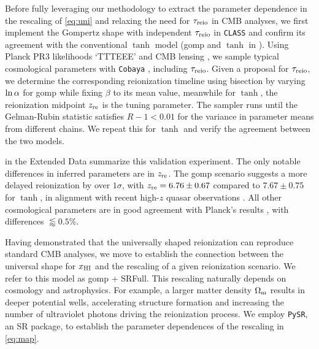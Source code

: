 Before fully leveraging our methodology to extract the parameter
dependence in the rescaling of \cref{eq:uni} and relaxing the need for
$\tau_{\mathrm{reio}}$ in CMB analyses, we first implement the Gompertz shape with
independent $\tau_{\mathrm{reio}}$ in \texttt{CLASS} and confirm its agreement
with the conventional $\tanh$ model (gomp and $\tanh$ in
).
Using Planck PR3 likelihoods `TTTEEE' \cite{Planck2020c} and CMB lensing
\cite{Planck2020d}, we sample typical cosmological parameters with
\texttt{Cobaya} \cite{Torrado2020}, including $\tau_{\mathrm{reio}}$.
Given a proposal for $\tau_{\mathrm{reio}}$, we determine the corresponding
reionization timeline using bisection by varying $\ln\alpha$ for gomp
while fixing $\beta$ to its mean value,
meanwhile for $\tanh$, the reionization midpoint $z_{\mathrm{re}}$ is the tuning
parameter.
The sampler runs until the Gelman-Rubin statistic \cite{Gelman1992}
satisfies $R - 1 < 0.01$ for the variance in parameter means from
different chains.
We repeat this for $\tanh$ and verify the agreement between the two
models.

 in the Extended Data summarize this
validation experiment.
The only notable differences in inferred parameters are in $z_{\mathrm{re}}$.
The gomp scenario suggests a more delayed reionization by over
$1\sigma$, with $z_{\mathrm{re}} = 6.76 \pm 0.67$ compared to $7.67 \pm 0.75$ for
$\tanh$, in alignment with recent high-$z$ quasar observations
\cite{Keating2020}.
All other cosmological parameters are in good agreement with Planck's
results \cite{Planck2020a}, with differences $\lessapprox 0.5 \%$.

Having demonstrated that the universally shaped reionization can
reproduce standard CMB analyses, we move to establish the connection
between the universal shape for $x_{\mathrm{HI}}$ and the rescaling of a given
reionization scenario.
We refer to this model as gomp + SRFull.
This rescaling naturally depends on cosmology and astrophysics.
For example, a larger matter density $\Omega_\mathrm{m}$ results in deeper
potential wells, accelerating structure formation and increasing the
number of ultraviolet photons driving the reionization process.
We employ \texttt{PySR}, an SR package, to establish the parameter
dependences of the rescaling in \cref{eq:map}.

